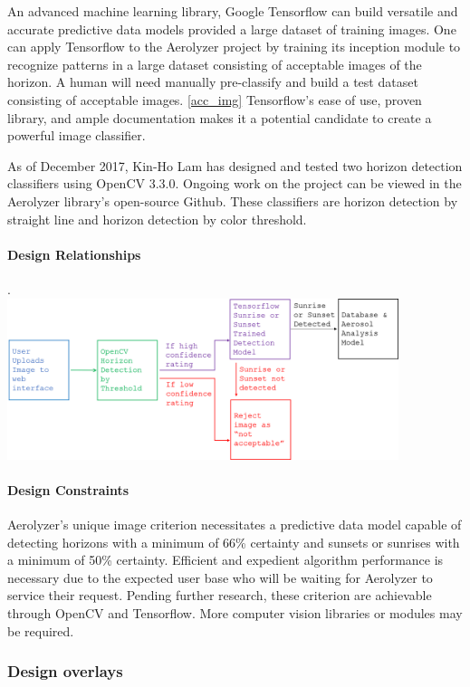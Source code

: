 \documentclass[onecolumn, draftclsnofoot,10pt, compsoc]{IEEEtran}
\begin{document}
\begin{singlespace}
				An advanced machine learning library, Google Tensorflow can build versatile and accurate predictive data models provided a large dataset of training images. One can apply Tensorflow to the Aerolyzer project by training its inception module to recognize patterns in a large dataset consisting of acceptable images of the horizon. A human will need manually pre-classify and build a test dataset consisting of acceptable images. \ref{acc_img}  Tensorflow’s ease of use, proven library, and ample documentation makes it a potential candidate to create a powerful image classifier. \cite{rhnvrm} \cite{RNN}

				As of December 2017, Kin-Ho Lam has designed and tested two horizon detection classifiers using OpenCV 3.3.0. Ongoing work on the project can be viewed in the Aerolyzer library’s open-source Github. These classifiers are horizon detection by straight line and horizon detection by color threshold.

          \paragraph{Design Relationships}
					.\\
					\includegraphics[width=4.5in,natwidth=1907,natheight=787]{images/tensor.png}

          \paragraph{Design Constraints}
          		Aerolyzer’s unique image criterion necessitates a predictive data model capable of detecting horizons with a minimum of 66\% certainty and sunsets or sunrises with a minimum of 50\% certainty. Efficient and expedient algorithm performance is necessary due to the expected user base who will be waiting for Aerolyzer to service their request. Pending further research, these criterion are achievable through OpenCV and Tensorflow. More computer vision libraries or modules may be required.
      
      \subsubsection{Design overlays}

\end{singlespace}
\end{document}
